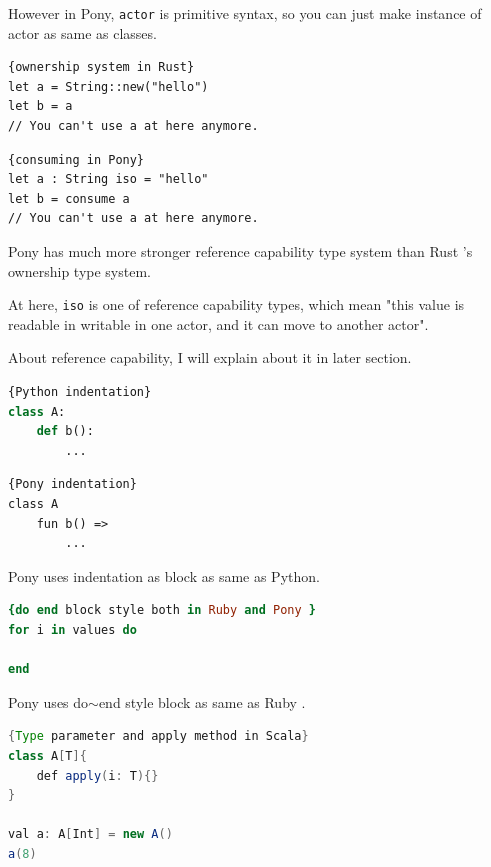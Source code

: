 \documentclass{article}
\begin{document}
\begin{multicols}{2}
However in Pony, \texttt{actor} is primitive syntax, so you can just make instance of actor as same as classes. \\





\begin{lstlisting}{ownership system in Rust}
let a = String::new("hello")
let b = a
// You can't use a at here anymore.
\end{lstlisting}

\begin{lstlisting}{consuming in Pony}
let a : String iso = "hello"
let b = consume a
// You can't use a at here anymore.
\end{lstlisting}

Pony has much more stronger reference capability type system than Rust \cite{rust} 's ownership type system. 

At here, \texttt{iso} is one of reference capability types, which mean "this value is readable in writable in one actor, and it can move to another actor".

About reference capability, I will explain about it in later section.
\\



\begin{lstlisting}[language=Python]{Python indentation}
class A:
	def b():
		...
\end{lstlisting}

\begin{lstlisting}{Pony indentation}
class A
	fun b() =>
		...
\end{lstlisting}


Pony uses indentation as block as same as Python\cite{python}.\\

\begin{lstlisting}[language=Ruby]{do end block style both in Ruby and Pony }
for i in values do
	
end		
\end{lstlisting}

 Pony uses do$\sim$end style block as same as Ruby \cite{ruby}. \\


\begin{lstlisting}[language=Java]{Type parameter and apply method in Scala}
class A[T]{
	def apply(i: T){}
}	

val a: A[Int] = new A()
a(8)
\end{lstlisting}


\end{multicols}
\end{document}
